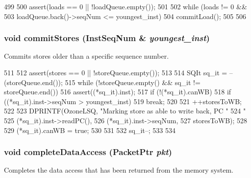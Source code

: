\begin{DoxyCode}
499 {
500     assert(loads == 0 || !loadQueue.empty());
501 
502     while (loads != 0 &&
503            loadQueue.back()->seqNum <= youngest_inst) {
504         commitLoad();
505     }
506 }
\end{DoxyCode}
\hypertarget{classOzoneLWLSQ_a954ce1ce58b67cae49ba127d5ea40701}{
\subsubsection[{commitStores}]{\setlength{\rightskip}{0pt plus 5cm}void commitStores ({\bf InstSeqNum} \& {\em youngest\_\-inst})}}
\label{classOzoneLWLSQ_a954ce1ce58b67cae49ba127d5ea40701}
Commits stores older than a specific sequence number. 


\begin{DoxyCode}
511 {
512     assert(stores == 0 || !storeQueue.empty());
513 
514     SQIt sq_it = --(storeQueue.end());
515     while (!storeQueue.empty() && sq_it != storeQueue.end()) {
516         assert((*sq_it).inst);
517         if (!(*sq_it).canWB) {
518             if ((*sq_it).inst->seqNum > youngest_inst) {
519                 break;
520             }
521             ++storesToWB;
522 
523             DPRINTF(OzoneLSQ, "Marking store as able to write back, PC "
524                     "%
525                     (*sq_it).inst->readPC(),
526                     (*sq_it).inst->seqNum,
527                     storesToWB);
528 
529             (*sq_it).canWB = true;
530         }
531 
532         sq_it--;
533     }
534 }
\end{DoxyCode}
\hypertarget{classOzoneLWLSQ_a0f7f0d3412bbf494cd3d0c0f48e5fcf2}{
\subsubsection[{completeDataAccess}]{\setlength{\rightskip}{0pt plus 5cm}void completeDataAccess ({\bf PacketPtr} {\em pkt})}}
\label{classOzoneLWLSQ_a0f7f0d3412bbf494cd3d0c0f48e5fcf2}
Completes the data access that has been returned from the memory system. 


